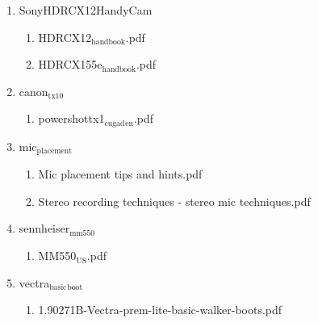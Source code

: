\documentclass[11pt]{article}
\begin{document}
\begin{enumerate}
\item SonyHDRCX12HandyCam
\label{sec-1-1-1-1-23-5}
\begin{enumerate}
\item HDRCX12$_{\text{handbook}}$.pdf
\label{sec-1-1-1-1-23-5-1}

\item HDRCX155e$_{\text{handbook}}$.pdf
\label{sec-1-1-1-1-23-5-2}
\end{enumerate}

\item canon$_{\text{tx10}}$
\label{sec-1-1-1-1-23-6}
\begin{enumerate}
\item powershottx1$_{\text{cugad}}$$_{\text{en}}$.pdf
\label{sec-1-1-1-1-23-6-1}
\end{enumerate}

\item mic$_{\text{placement}}$
\label{sec-1-1-1-1-23-7}
\begin{enumerate}
\item Mic placement tips and hints.pdf
\label{sec-1-1-1-1-23-7-1}

\item Stereo recording techniques - stereo mic techniques.pdf
\label{sec-1-1-1-1-23-7-2}
\end{enumerate}

\item sennheiser$_{\text{mm550}}$
\label{sec-1-1-1-1-23-8}
\begin{enumerate}
\item MM550$_{\text{US}}$.pdf
\label{sec-1-1-1-1-23-8-1}
\end{enumerate}

\item vectra$_{\text{basic}}$$_{\text{boot}}$
\label{sec-1-1-1-1-23-9}
\begin{enumerate}
\item 1.90271B-Vectra-prem-lite-basic-walker-boots.pdf
\label{sec-1-1-1-1-23-9-1}
\end{enumerate}
\end{enumerate}
\end{document}
